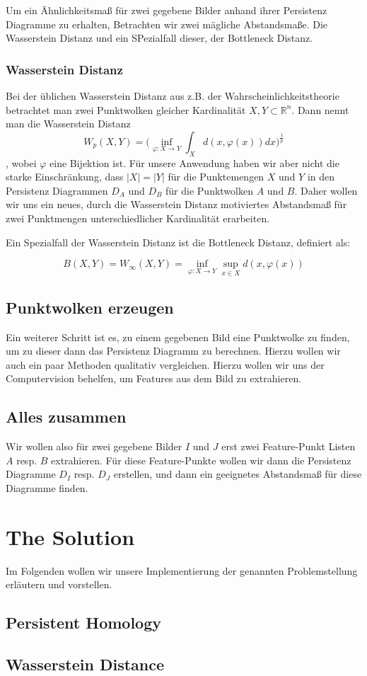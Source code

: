 \documentclass[11pt, a4paper,draft]{report}
\newcommand{\bR}{\mathbb{R}}
\begin{document}
	Um ein Ähnlichkeitsmaß für zwei gegebene Bilder anhand ihrer Persistenz Diagramme zu erhalten, Betrachten wir zwei mägliche Abstandsmaße. Die Wasserstein Distanz und ein SPezialfall dieser, der Bottleneck Distanz.
	
	\subsubsection*{Wasserstein Distanz}
	
	Bei der üblichen Wasserstein Distanz aus z.B. der Wahrscheinlichkeitstheorie betrachtet man zwei Punktwolken gleicher Kardinalität $X,Y\subset\bR^n$. Dann nennt man die Wasserstein Distanz $$W_p(X,Y)=\bigg(\inf_{\varphi:X\rightarrow Y}\int_{X}d(x,\varphi(x))dx\bigg)^{\frac{1}{p}}$$, wobei $\varphi$ eine Bijektion ist. Für unsere Anwendung haben wir aber nicht die starke Einschränkung, dass $|X| = |Y|$ für die Punktemengen $X$ und $Y$ in den Persistenz Diagrammen $D_A$ und $D_B$ für die Punktwolken $A$ und $B$. Daher wollen wir uns ein neues, durch die Wasserstein Distanz motiviertes Abstandsmaß für zwei Punktmengen unterschiedlicher Kardinalität erarbeiten. 
	
	Ein Spezialfall der Wasserstein Distanz ist die Bottleneck Distanz, definiert als:
	
	$$B(X,Y) = W_\infty(X,Y) = \inf_{\varphi:X\rightarrow Y}\sup_{x\in X}d(x,\varphi(x))$$
	
	\subsection*{Punktwolken erzeugen}
	
	Ein weiterer Schritt ist es, zu einem gegebenen Bild eine Punktwolke zu finden, um zu dieser dann das Persistenz Diagramm zu berechnen. Hierzu wollen wir auch ein paar Methoden qualitativ vergleichen. Hierzu wollen wir uns der Computervision behelfen, um Features aus dem Bild zu extrahieren. 
	
	\subsection*{Alles zusammen}
	
	Wir wollen also für zwei gegebene Bilder $I$ und $J$ erst zwei Feature-Punkt Listen $A$ resp. $B$ extrahieren. Für diese Feature-Punkte wollen wir dann die Persistenz Diagramme $D_I$ resp. $D_J$ erstellen, und dann ein geeignetes Abstandsmaß für diese Diagramme finden.
	
	
	
	\section*{The Solution}
	
	Im Folgenden wollen wir unsere Implementierung der genannten Problemstellung erläutern und vorstellen.
	
	\subsection*{Persistent Homology}
	
	\subsection*{Wasserstein Distance}
	
	
\end{document}
